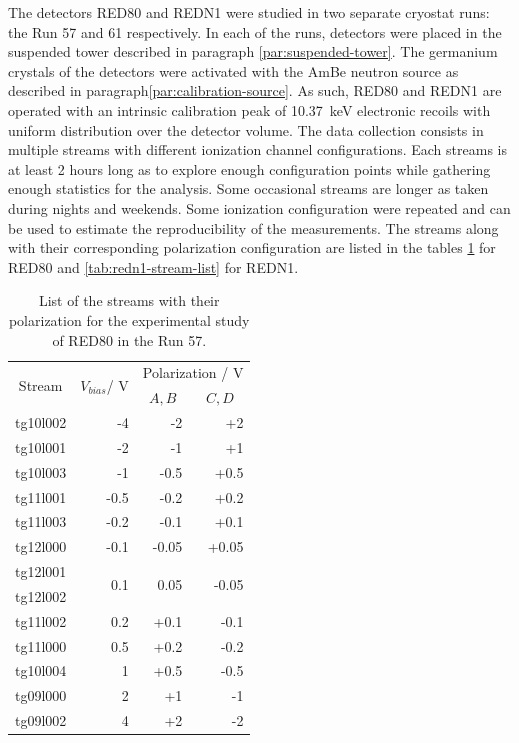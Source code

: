 The detectors RED80 and REDN1 were studied in two separate cryostat runs: the Run 57 and 61 respectively. In each of the runs, detectors were placed in the suspended tower described in paragraph \ref{par:suspended-tower}. The germanium crystals of the detectors were activated with the AmBe neutron source as described in paragraph\ref{par:calibration-source}. As such, RED80 and REDN1 are operated with an intrinsic calibration peak of \SI{10.37}{\kilo\eV} electronic recoils with uniform distribution over the detector volume. The data collection consists in multiple streams with different ionization channel configurations. Each streams is at least 2 hours long as to explore enough configuration points while gathering enough statistics for the analysis. Some occasional streams are longer as taken during nights and weekends. Some ionization configuration were repeated and can be used to estimate the reproducibility of the measurements. The streams along with their corresponding polarization configuration are listed in the tables \ref{tab:red80-stream-list} for RED80 and \ref{tab:redn1-stream-list} for REDN1.

\begin{table}[]
\centering
\begin{tabular}{c|rrr}
\multicolumn{1}{c|}{\multirow{2}{*}{Stream}} & \multicolumn{1}{c}{\multirow{2}{*}{$V_{bias}$/ V}} & \multicolumn{2}{|c}{Polarization / V}              \\ \cline{3-4} 
\multicolumn{1}{c|}{}                        & \multicolumn{1}{c|}{}                               & \multicolumn{1}{c|}{$A,B$} & \multicolumn{1}{c}{$C,D$} \\ \hline \hline
tg10l002 & -4   & -2    & +2    \\ \hline
tg10l001 & -2   & -1    & +1    \\ \hline
tg10l003 & -1   & -0.5  & +0.5  \\ \hline
tg11l001 & -0.5 & -0.2  & +0.2  \\ \hline
tg11l003 & -0.2 & -0.1  & +0.1  \\ \hline
tg12l000 & -0.1 & -0.05 & +0.05 \\ \hline
tg12l001                                     & \multirow{2}{*}{0.1}                                & \multirow{2}{*}{0.05}    & \multirow{2}{*}{-0.05}  \\
tg12l002 &      &       &       \\ \hline
tg11l002 & 0.2  & +0.1  & -0.1  \\ \hline
tg11l000 & 0.5  & +0.2  & -0.2  \\ \hline
tg10l004 & 1    & +0.5  & -0.5  \\ \hline
tg09l000 & 2    & +1    & -1    \\ \hline
tg09l002 & 4    & +2    & -2   
\end{tabular}%
\caption{List of the streams with their polarization for the experimental study of RED80 in the Run 57.}
\label{tab:red80-stream-list}
\end{table}

